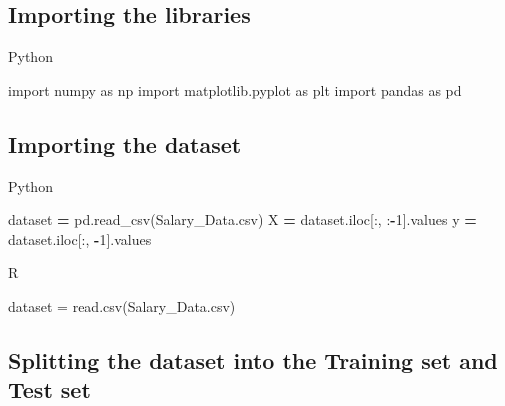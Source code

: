 \documentclass[
]{book}
\newenvironment{Shaded}{\begin{snugshade}}{\end{snugshade}}
\newcommand{\DecValTok}[1]{\textcolor[rgb]{0.00,0.00,0.81}{#1}}
\newcommand{\FunctionTok}[1]{\textcolor[rgb]{0.00,0.00,0.00}{#1}}
\newcommand{\ImportTok}[1]{#1}
\newcommand{\NormalTok}[1]{#1}
\newcommand{\OperatorTok}[1]{\textcolor[rgb]{0.81,0.36,0.00}{\textbf{#1}}}
\newcommand{\OtherTok}[1]{\textcolor[rgb]{0.56,0.35,0.01}{#1}}
\newcommand{\StringTok}[1]{\textcolor[rgb]{0.31,0.60,0.02}{#1}}
\theoremstyle{definition}
\theoremstyle{definition}
\theoremstyle{definition}
\theoremstyle{definition}
\theoremstyle{remark}
\begin{document}
\hypertarget{importing-the-libraries-1}{%
\subsection{Importing the libraries}\label{importing-the-libraries-1}}

Python

\begin{Shaded}
\begin{Highlighting}[]
\ImportTok{import}\NormalTok{ numpy }\ImportTok{as}\NormalTok{ np}
\ImportTok{import}\NormalTok{ matplotlib.pyplot }\ImportTok{as}\NormalTok{ plt}
\ImportTok{import}\NormalTok{ pandas }\ImportTok{as}\NormalTok{ pd}
\end{Highlighting}
\end{Shaded}

\hypertarget{importing-the-dataset-1}{%
\subsection{Importing the dataset}\label{importing-the-dataset-1}}

Python

\begin{Shaded}
\begin{Highlighting}[]
\NormalTok{dataset }\OperatorTok{=}\NormalTok{ pd.read\_csv(}\StringTok{\textquotesingle{}Salary\_Data.csv\textquotesingle{}}\NormalTok{)}
\NormalTok{X }\OperatorTok{=}\NormalTok{ dataset.iloc[:, :}\OperatorTok{{-}}\DecValTok{1}\NormalTok{].values}
\NormalTok{y }\OperatorTok{=}\NormalTok{ dataset.iloc[:, }\OperatorTok{{-}}\DecValTok{1}\NormalTok{].values}
\end{Highlighting}
\end{Shaded}

R

\begin{Shaded}
\begin{Highlighting}[]
\NormalTok{dataset }\OtherTok{=} \FunctionTok{read.csv}\NormalTok{(}\StringTok{\textquotesingle{}Salary\_Data.csv\textquotesingle{}}\NormalTok{)}
\end{Highlighting}
\end{Shaded}

\hypertarget{splitting-the-dataset-into-the-training-set-and-test-set-1}{%
\subsection{Splitting the dataset into the Training set and Test set}\label{splitting-the-dataset-into-the-training-set-and-test-set-1}}
\end{document}
